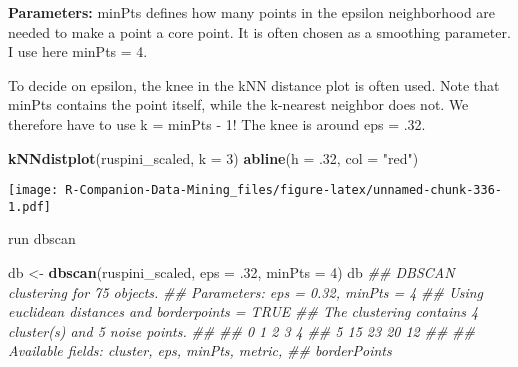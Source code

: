 \documentclass[
  notitlepage]{book}
\newenvironment{Shaded}{\begin{snugshade}}{\end{snugshade}}
\newcommand{\CommentTok}[1]{\textcolor[rgb]{0.56,0.35,0.01}{\textit{#1}}}
\newcommand{\DataTypeTok}[1]{\textcolor[rgb]{0.13,0.29,0.53}{#1}}
\newcommand{\DecValTok}[1]{\textcolor[rgb]{0.00,0.00,0.81}{#1}}
\newcommand{\FloatTok}[1]{\textcolor[rgb]{0.00,0.00,0.81}{#1}}
\newcommand{\KeywordTok}[1]{\textcolor[rgb]{0.13,0.29,0.53}{\textbf{#1}}}
\newcommand{\NormalTok}[1]{#1}
\newcommand{\StringTok}[1]{\textcolor[rgb]{0.31,0.60,0.02}{#1}}
\begin{document}
\textbf{Parameters:} minPts defines how many points in the epsilon
neighborhood are needed to make a point a core point. It is often chosen
as a smoothing parameter. I use here minPts = 4.

To decide on epsilon, the knee in the kNN distance plot is often used.
Note that minPts contains the point itself, while the k-nearest neighbor
does not. We therefore have to use k = minPts - 1! The knee is around
eps = .32.

\begin{Shaded}
\begin{Highlighting}[]
\KeywordTok{kNNdistplot}\NormalTok{(ruspini\_scaled, }\DataTypeTok{k =} \DecValTok{3}\NormalTok{)}
\KeywordTok{abline}\NormalTok{(}\DataTypeTok{h =} \FloatTok{.32}\NormalTok{, }\DataTypeTok{col =} \StringTok{"red"}\NormalTok{)}
\end{Highlighting}
\end{Shaded}

\texttt{[image: R-Companion-Data-Mining\_files/figure-latex/unnamed-chunk-336-1.pdf]}

run dbscan

\begin{Shaded}
\begin{Highlighting}[]
\NormalTok{db \textless{}{-}}\StringTok{ }\KeywordTok{dbscan}\NormalTok{(ruspini\_scaled, }\DataTypeTok{eps =} \FloatTok{.32}\NormalTok{, }\DataTypeTok{minPts =} \DecValTok{4}\NormalTok{)}
\NormalTok{db}
\CommentTok{\#\# DBSCAN clustering for 75 objects.}
\CommentTok{\#\# Parameters: eps = 0.32, minPts = 4}
\CommentTok{\#\# Using euclidean distances and borderpoints = TRUE}
\CommentTok{\#\# The clustering contains 4 cluster(s) and 5 noise points.}
\CommentTok{\#\# }
\CommentTok{\#\#  0  1  2  3  4 }
\CommentTok{\#\#  5 15 23 20 12 }
\CommentTok{\#\# }
\CommentTok{\#\# Available fields: cluster, eps, minPts, metric,}
\CommentTok{\#\#                   borderPoints}
\end{Highlighting}
\end{Shaded}

\begin{Shaded}
\end{Shaded}
\end{document}
